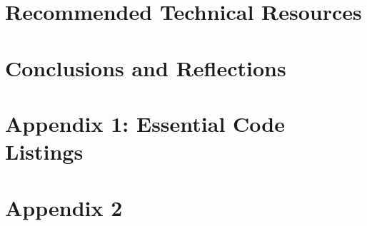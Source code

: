 \documentclass[onecolumn, draftclsnofoot,10pt, compsoc]{IEEEtran}
\begin{document}
	\section{Recommended Technical Resources}
	
	\section{Conclusions and Reflections}
	
	\section{Appendix 1: Essential Code Listings}
	\section{Appendix 2}
	
	
	
	
	
\end{document}
